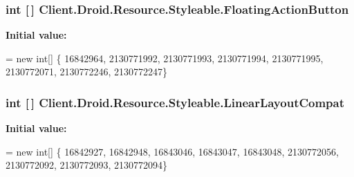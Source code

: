 \subsubsection[{Floating\+Action\+Button}]{\setlength{\rightskip}{0pt plus 5cm}int \mbox{[}$\,$\mbox{]} Client.\+Droid.\+Resource.\+Styleable.\+Floating\+Action\+Button\hspace{0.3cm}{\ttfamily [static]}}\label{classClient_1_1Droid_1_1Resource_1_1Styleable_a9dd3d022980fad88f04bdeb5bc0d4114}
{\bfseries Initial value\+:}
\begin{DoxyCode}
= \textcolor{keyword}{new} \textcolor{keywordtype}{int}[]
            \{
                    16842964,
                    2130771992,
                    2130771993,
                    2130771994,
                    2130771995,
                    2130772071,
                    2130772246,
                    2130772247\}
\end{DoxyCode}
\hypertarget{classClient_1_1Droid_1_1Resource_1_1Styleable_a5231c4929c3a610e94bc853d1a592e19}{}
\subsubsection[{Linear\+Layout\+Compat}]{\setlength{\rightskip}{0pt plus 5cm}int \mbox{[}$\,$\mbox{]} Client.\+Droid.\+Resource.\+Styleable.\+Linear\+Layout\+Compat\hspace{0.3cm}{\ttfamily [static]}}\label{classClient_1_1Droid_1_1Resource_1_1Styleable_a5231c4929c3a610e94bc853d1a592e19}
{\bfseries Initial value\+:}
\begin{DoxyCode}
= \textcolor{keyword}{new} \textcolor{keywordtype}{int}[]
            \{
                    16842927,
                    16842948,
                    16843046,
                    16843047,
                    16843048,
                    2130772056,
                    2130772092,
                    2130772093,
                    2130772094\}
\end{DoxyCode}
\hypertarget{classClient_1_1Droid_1_1Resource_1_1Styleable_ad297c7f6d223e05cf767c5b74fc37b0b}{}
